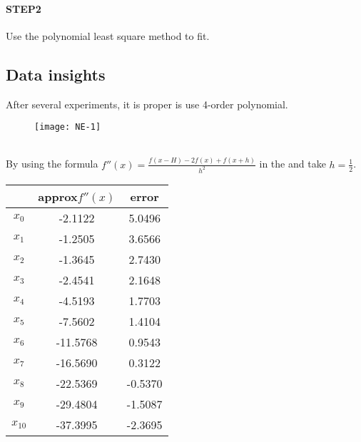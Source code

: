 \documentclass{article}
\begin{document}
\paragraph{STEP2} Use the polynomial least square method to fit.
\subsection{Data insights}
After several experiments, it is proper is use 4-order polynomial.
\begin{figure}[h]
  \centering
  \texttt{[image: NE-1]}\\
  \label{1}
\end{figure}
\\
By using the formula $f''(x)=\frac{f(x-H)-2f(x)+f(x+h)}{h^2}$ in the and take $h=\frac12$.
\begin{center}
\begin{tabular}{|c|c|c|}
  \hline
        & approx$f''(x)$ &error\\
  \hline
  $x_0$ &-2.1122  &5.0496\\
  $x_1$ &-1.2505  &3.6566\\
  $x_2$ &-1.3645  &2.7430\\
  $x_3$ &-2.4541  &2.1648\\
  $x_4$ &-4.5193  &1.7703\\
  $x_5$ &-7.5602  &1.4104\\
  $x_6$ &-11.5768 &0.9543\\
  $x_7$ &-16.5690  &0.3122\\
  $x_8$ &-22.5369 &-0.5370\\
  $x_9$ &-29.4804  &-1.5087\\
  $x_{10}$ &-37.3995  &-2.3695\\
  \hline
\end{tabular}
\end{center}
\end{document}
